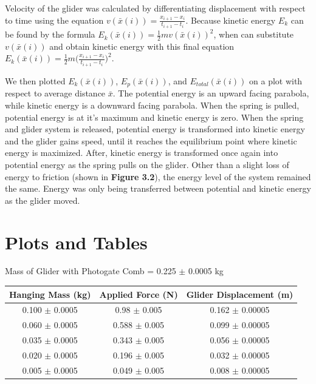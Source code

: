 \documentclass[11pt]{report}
\begin{document}
Velocity of the glider was calculated by differentiating displacement with respect to
time using the equation \(v(\bar{x}(i)) = \frac{x_{i+1} - x_i}{t_{i+1} - t_i}\).
Because kinetic energy \(E_k\) can be found by the formula \(E_k(\bar{x}(i)) =
\frac{1}{2}mv(\bar{x}(i))^2\), when can substitute \(v(\bar{x}(i))\) and obtain
kinetic energy with this final equation \(E_k(\bar{x}(i)) =
\frac{1}{2}m\Bigg(\frac{x_{i+1} - x_i}{t_{i+1} - t_i}\Bigg)^2\). 

We then plotted \(E_k(\bar{x}(i))\), \(E_p(\bar{x}(i))\), and
\(E_{total}(\bar{x}(i))\) on a
plot with respect to average distance $\bar{x}$.  The potential energy is an
upward facing parabola, while kinetic energy is a downward facing parabola.
When the spring is pulled, potential energy is at it's maximum and kinetic
energy is zero.  When the spring and glider system is released, potential energy
is transformed into kinetic energy and the glider gains speed, until it reaches
the equilibrium point where kinetic energy is maximized.  After, kinetic energy
is transformed once again into potential energy as the spring pulls on the
glider.  Other than a slight loss of energy to friction (shown in \textbf{Figure
3.2}), the energy level of the system remained the same.  Energy was only being
transferred between potential and kinetic energy as the glider moved.

\section*{Plots and Tables}
Mass of Glider with Photogate Comb = 0.225 $\pm$ 0.0005 kg

\begin{center}
    \begin{tabular}{| c | c | c |}
        \hline
        Hanging Mass (kg) & Applied Force (N) & Glider Displacement (m) \\
        \hline
        0.100 $\pm$ 0.0005  & 0.98 $\pm$ 0.005 & 0.162 $\pm$ 0.00005 \\
        \hline
        0.060 $\pm$ 0.0005 & 0.588 $\pm$ 0.005 & 0.099 $\pm$ 0.00005 \\
        \hline
        0.035 $\pm$ 0.0005 & 0.343 $\pm$ 0.005 & 0.056 $\pm$ 0.00005 \\
        \hline
        0.020 $\pm$ 0.0005 & 0.196 $\pm$ 0.005 & 0.032 $\pm$ 0.00005 \\
        \hline
        0.005 $\pm$ 0.0005 & 0.049 $\pm$ 0.005 & 0.008 $\pm$ 0.00005 \\
        \hline
    \end{tabular}
\end{center}
\end{document}
